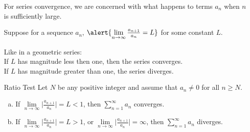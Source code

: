 \begin{frame}[t]

For series convergence, we are concerned with what happens to terms $a_n$ when $n$ is sufficiently large.

Suppose for a sequence $a_n$, $\alert{\lim\limits_{n \to \infty} \frac{a_{n+1}}{a_n}=L}$ for some constant $L$.\vfill

\begin{center}\end{center}
\vfill
Like in a geometric series:\\[1em]
If  $L$ has magnitude \alert{less then one}, then the series converges.\\
If  $L$ has magnitude \alert{greater than one}, the series diverges.

\end{frame}

\begin{frame}[t]
\begin{block}{Ratio Test}
Let $N$ be any positive integer and assume that $a_n\ne 0$ for all $n\ge N$.
\begin{enumerate}[(a)]
\item If $\lim\limits_{n\rightarrow\infty}\Big|\frac{a_{n+1}}{a_n}\Big| = L<1$,
then $\sum\limits_{n=1}^\infty a_n$ converges.
\item If $\lim\limits_{n\rightarrow\infty}\Big|\frac{a_{n+1}}{a_n}\Big| = L>1$,
or $\lim\limits_{n\rightarrow\infty}\Big|\frac{a_{n+1}}{a_n}\Big| = \infty$,
then $\sum\limits_{n=1}^\infty a_n$ diverges.
\end{enumerate}
\end{block}
\end{frame}

